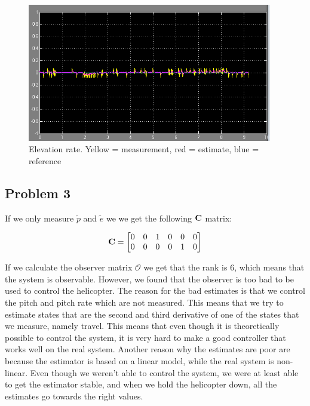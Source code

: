 \begin{figure}[H]
	\centering
	\includegraphics[width=0.95\textwidth]{images/est_med_int/ed_est.png}
	\caption{Elevation rate. Yellow = measurement, red = estimate, blue = reference}
	\label{fig:edest}
\end{figure}


\subsection{Problem 3}
If we only measure $\tilde p$ and $\tilde e$ we we get the following $\mathbf{C}$ matrix:

\begin{equation}
	\mathbf{C} = \begin{bmatrix}
		0 & 0 & 1 & 0 & 0 & 0\\
		0 & 0 & 0 & 0 & 1 & 0
	\end{bmatrix}
\end{equation}

If we calculate the observer matrix $\mathcal{O}$ we get that the rank is 6, which means that the system is observable. However, we found that the observer is too bad to be used to control the helicopter. The reason for the bad estimates is that we control the pitch and pitch rate which are not measured. This means that we try to estimate states that are the second and third derivative of one of the states that we measure, namely travel. This means that even though it is theoretically possible to control the system, it is very hard to make a good controller that works well on the real system. Another reason why the estimates are poor are because the estimator is based on a linear model, while the real system is non-linear. Even though we weren't able to control the system, we were at least able to get the estimator stable, and when we hold the helicopter down, all the estimates go towards the right values.